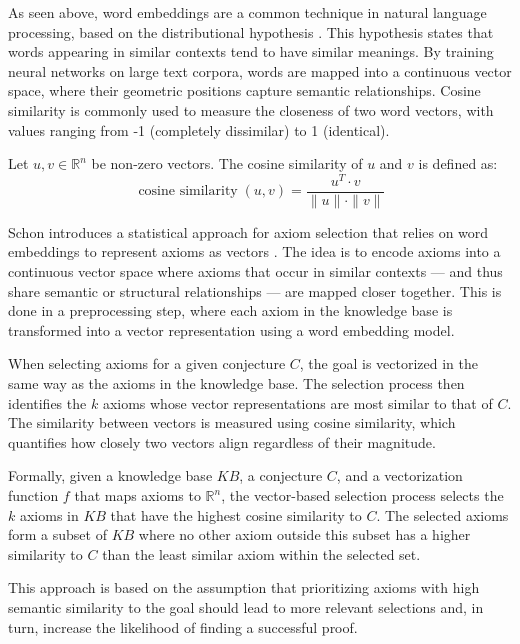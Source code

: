 \documentclass[english,version-2020-11]{uzl-thesis}
\begin{document}
As seen above, word embeddings are a common technique in natural language processing, based on the distributional hypothesis \cite{Miller1991}. This hypothesis states that words appearing in similar contexts tend to have similar meanings. By training neural networks on large text corpora, words are mapped into a continuous vector space, where their geometric positions capture semantic relationships. Cosine similarity is commonly used to measure the closeness of two word vectors, with values ranging from -1 (completely dissimilar) to 1 (identical).

\begin{definition}
    Let \( u, v \in \mathbb{R}^n \) be non-zero vectors. The cosine similarity of \( u \) and \( v \) is defined as:
    \begin{equation}
        \operatorname{cosine\ similarity}(u, v) = \frac{u^T \cdot v}{\|u\| \cdot \|v\|}
    \end{equation}
\end{definition}

Schon introduces a statistical approach for axiom selection that relies on word embeddings to represent axioms as vectors \cite{Schon2023}. The idea is to encode axioms into a continuous vector space where axioms that occur in similar contexts — and thus share semantic or structural relationships — are mapped closer together. This is done in a preprocessing step, where each axiom in the knowledge base is transformed into a vector representation using a word embedding model.

When selecting axioms for a given conjecture \( C \), the goal is vectorized in the same way as the axioms in the knowledge base. The selection process then identifies the \( k \) axioms whose vector representations are most similar to that of \( C \). The similarity between vectors is measured using cosine similarity, which quantifies how closely two vectors align regardless of their magnitude.

Formally, given a knowledge base \( KB \), a conjecture \( C \), and a vectorization function \( f \) that maps axioms to \( \mathbb{R}^n \), the vector-based selection process selects the \( k \) axioms in \( KB \) that have the highest cosine similarity to \( C \). The selected axioms form a subset of \( KB \) where no other axiom outside this subset has a higher similarity to \( C \) than the least similar axiom within the selected set.

This approach is based on the assumption that prioritizing axioms with high semantic similarity to the goal should lead to more relevant selections and, in turn, increase the likelihood of finding a successful proof.
\end{document}
